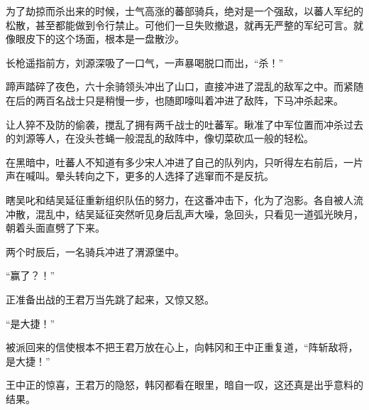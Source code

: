 为了劫掠而杀出来的时候，士气高涨的蕃部骑兵，绝对是一个强敌，以蕃人军纪的松散，甚至都能做到令行禁止。可他们一旦失败撤退，就再无严整的军纪可言。就像眼皮下的这个场面，根本是一盘散沙。

长枪遥指前方，刘源深吸了一口气，一声暴喝脱口而出，“杀！”

蹄声踏碎了夜色，六十余骑领头冲出了山口，直接冲进了混乱的敌军之中。而紧随在后的两百名战士只是稍慢一步，也随即嚎叫着冲进了敌阵，下马冲杀起来。

让人猝不及防的偷袭，搅乱了拥有两千战士的吐蕃军。瞅准了中军位置而冲杀过去的刘源等人，在没头苍蝇一般混乱的敌阵中，像切菜砍瓜一般的轻松。

在黑暗中，吐蕃人不知道有多少宋人冲进了自己的队列内，只听得左右前后，一片声在喊叫。晕头转向之下，更多的人选择了逃窜而不是反抗。

瞎吴叱和结吴延征重新组织队伍的努力，在这番冲击下，化为了泡影。各自被人流冲散，混乱中，结吴延征突然听见身后乱声大噪，急回头，只看见一道弧光映月，朝着头面直劈了下来。

两个时辰后，一名骑兵冲进了渭源堡中。

“赢了？！”

正准备出战的王君万当先跳了起来，又惊又怒。

“是大捷！”

被派回来的信使根本不把王君万放在心上，向韩冈和王中正重复道，“阵斩敌将，是大捷！”

王中正的惊喜，王君万的隐怒，韩冈都看在眼里，暗自一叹，这还真是出乎意料的结果。

